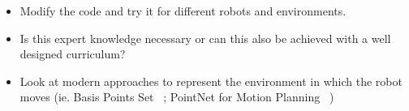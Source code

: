 \documentclass[a4paper]{article}
\begin{document}


\begin{itemize}
  \item Modify the code and try it for different robots and environments.
  \item Is this expert knowledge necessary or can this also be achieved with a well designed curriculum?
  \item Look at modern approaches to represent the environment in which the robot moves (ie. Basis Points Set ~\cite{Prokudin2019}; PointNet for Motion Planning ~\cite{Strudel2020})
\end{itemize}


%
\end{document}
